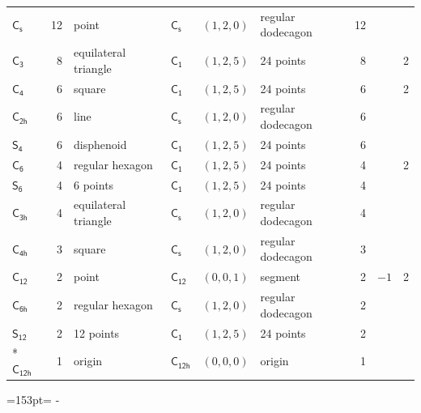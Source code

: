 \documentclass[10pt,a4paper]{article}
\newcommand{\needspace}[1]{\par\penalty-100\begingroup\dimen0=#1\relax\dimen2=\pagegoal
  \advance\dimen2-\pagetotal\ifdim\dimen0>\dimen2\relax\ifdim\dimen2>0pt\vfil\break\fi\fi
  \endgroup}
\numberwithin{equation}{section}
\newcommand{\grp}[1]{\mathsf{#1}}
\newlength{\fillwidth}\newlength{\cellwidth}\newlength{\colwidth}
\begin{document}
{\begin{longtable}{@{}lrllllr>{\RaggedRight\arraybackslash}p{\fillwidth}r@{}}
\href{C1v.pdf}{$\grp{C_{s}}$} & 12 & point & \href{C1v.pdf}{$\grp{C_{s}}$} & $(1, 2, 0)$ & regular dodecagon & 12 &  & \\
\href{C3.pdf}{$\grp{C_{3}}$} & 8 & equilateral triangle & \href{C1.pdf}{$\grp{C_{1}}$} & $(1, 2, 5)$ & 24 points & 8 &  & 2\\
\href{C4.pdf}{$\grp{C_{4}}$} & 6 & square & \href{C1.pdf}{$\grp{C_{1}}$} & $(1, 2, 5)$ & 24 points & 6 &  & 2\\
\href{C2h.pdf}{$\grp{C_{2h}}$} & 6 & line & \href{C1v.pdf}{$\grp{C_{s}}$} & $(1, 2, 0)$ & regular dodecagon & 6 &  & \\
\href{S4.pdf}{$\grp{S_{4}}$} & 6 & disphenoid & \href{C1.pdf}{$\grp{C_{1}}$} & $(1, 2, 5)$ & 24 points & 6 &  & \\
\href{C6.pdf}{$\grp{C_{6}}$} & 4 & regular hexagon & \href{C1.pdf}{$\grp{C_{1}}$} & $(1, 2, 5)$ & 24 points & 4 &  & 2\\
\href{S6.pdf}{$\grp{S_{6}}$} & 4 & 6 points & \href{C1.pdf}{$\grp{C_{1}}$} & $(1, 2, 5)$ & 24 points & 4 &  & \\
\href{C3h.pdf}{$\grp{C_{3h}}$} & 4 & equilateral triangle & \href{C1v.pdf}{$\grp{C_{s}}$} & $(1, 2, 0)$ & regular dodecagon & 4 &  & \\
\href{C4h.pdf}{$\grp{C_{4h}}$} & 3 & square & \href{C1v.pdf}{$\grp{C_{s}}$} & $(1, 2, 0)$ & regular dodecagon & 3 &  & \\
\href{C12.pdf}{$\grp{C_{12}}$} & 2 & point & \href{C12.pdf}{$\grp{C_{12}}$} & $(0, 0, 1)$ & segment & 2 & ${-1}$ & 2\\
\href{C6h.pdf}{$\grp{C_{6h}}$} & 2 & regular hexagon & \href{C1v.pdf}{$\grp{C_{s}}$} & $(1, 2, 0)$ & regular dodecagon & 2 &  & \\
\href{S12.pdf}{$\grp{S_{12}}$} & 2 & 12 points & \href{C1.pdf}{$\grp{C_{1}}$} & $(1, 2, 5)$ & 24 points & 2 &  & \\*
\href{C12h.pdf}{$\grp{C_{12h}}$} & 1 & origin & \href{C12h.pdf}{$\grp{C_{12h}}$} & $(0, 0, 0)$ & origin & 1 &  & \\
\bottomrule\end{longtable}}
\needspace{153pt}
\end{document}
